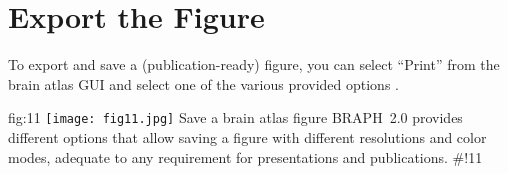 \documentclass[justified]{tufte-handout}
\begin{document}
\clearpage
\section{Export the Figure}

To export and save a (publication-ready) figure, you can select ``Print'' from the brain atlas GUI and select one of the various provided options .

	{fig:11}
	{\texttt{[image: fig11.jpg]}}
	{Save a brain atlas figure}
	{
	BRAPH~2.0 provides different options that allow saving a figure with different resolutions and color modes, adequate to any requirement for presentations and publications.
	}
#!11
\end{document}
